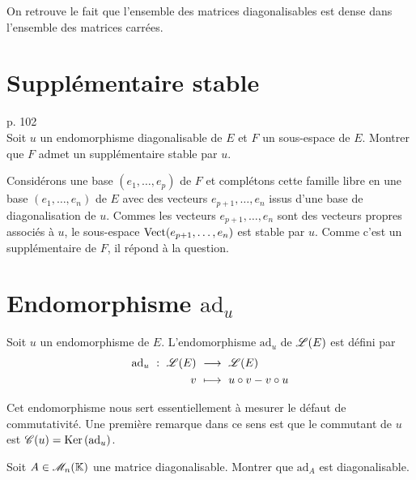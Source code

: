\begin{remarque}
    On retrouve le fait que l'ensemble des matrices diagonalisables est dense dans l'ensemble des matrices carrées.
\end{remarque}

\section{Supplémentaire stable}

\begin{exercice}
    \cite{reduc_des_endo} p. 102 \\
    Soit $u$ un endomorphisme diagonalisable de $E$ et $F$ un sous-espace de $E$. Montrer que $F$ admet un supplémentaire stable par $u$. 
\end{exercice}

\begin{solution}
    Considérons une base $(e_1, \dots, e_p)$ de $F$ et complétons cette famille libre en une base $(e_1, \dots, e_n)$ de $E$ avec des vecteurs $e_{p+1}, \dots, e_n$ issus d'une base de diagonalisation de $u$. Commes les vecteurs $e_{p+1}, \dots, e_n$ sont des vecteurs propres associés à $u$, le sous-espace $\mathrm{Vect}(e_{p+1}, \dots, e_n)$ est stable par $u$. Comme c'est un supplémentaire de $F$, il répond à la question. 
\end{solution} 

\section{Endomorphisme \texorpdfstring{$\mathrm{ad}_u$}{ad_u}}
\begin{defi}
    Soit $u$ un endomorphisme de $E$. L'endomorphisme $\mathrm{ad}_u$ de $\mathscr{L}(E)$ est défini par
    \begin{alignat*}{2}
        \mathrm{ad}_u\ :\ \mathscr{L}(E)\ &\longrightarrow\ \mathscr{L}(E)\\
        v\ &\longmapsto\ u \circ v - v \circ u
    \end{alignat*}
\end{defi}

Cet endomorphisme nous sert essentiellement à mesurer le défaut de commutativité. Une première remarque dans ce sens est que le commutant de $u$ est $\mathscr{C}(u) = \mathrm{Ker}\,(\mathrm{ad}_u)$. 

\begin{exercice}
    Soit $A \in \mathscr{M}_n(\mathbb{K})$ une matrice diagonalisable. Montrer que $\mathrm{ad}_A$ est diagonalisable.
\end{exercice}

